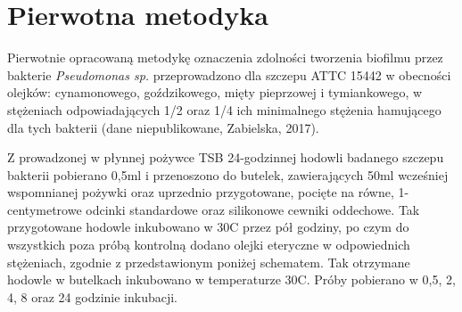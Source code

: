 \documentclass[11pt,a4paper]{report}
\begin{document}
\section{Pierwotna metodyka}\label{pierwotna}

Pierwotnie opracowaną metodykę oznaczenia zdolności tworzenia biofilmu przez bakterie \textit{Pseudomonas sp.} przeprowadzono dla szczepu ATTC 15442 w obecności olejków: cynamonowego, goździkowego, mięty pieprzowej i tymiankowego, w stężeniach odpowiadających 1/2 oraz 1/4 ich minimalnego stężenia hamującego dla tych bakterii (dane niepublikowane, Zabielska, 2017).\

Z prowadzonej w płynnej pożywce TSB 24-godzinnej hodowli badanego szczepu bakterii pobierano 0,5ml i przenoszono do butelek, zawierających 50ml wcześniej wspomnianej pożywki oraz uprzednio przygotowane, pocięte na równe, 1-centymetrowe odcinki standardowe oraz silikonowe cewniki oddechowe. 
Tak przygotowane hodowle inkubowano w 30\degree C przez pół godziny, po czym do wszystkich poza próbą kontrolną dodano olejki eteryczne w odpowiednich stężeniach, zgodnie z przedstawionym poniżej schematem.
Tak otrzymane hodowle w butelkach inkubowano w temperaturze 30\degree C.
Próby pobierano w 0,5, 2, 4, 8 oraz 24 godzinie inkubacji.
\end{document}
